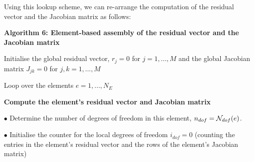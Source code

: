 Using this lookup scheme, we can re-\/arrange the computation of the residual vector and the Jacobian matrix as follows\-:

\begin{center} {\bfseries  Algorithm 6\-: Element-\/based assembly of the residual vector and the Jacobian matrix } \end{center} 
\begin{DoxyItemize}
\item Initialise the global residual vector, $ r_j=0 $ for $j=1,...,M $ and the global Jacobian matrix $ J_{jk}=0 $ for $j,k=1,...,M $
\item Loop over the elements $ e=1,...,N_E$ \par
\par
 \begin{center} {\bfseries  Compute the element's residual vector and Jacobian matrix } \end{center}  \par
 $ \bullet $ Determine the number of degrees of freedom in this element, $ n_{dof}={\cal N}_{dof}(e) $. \par
 $ \bullet $ Initialise the counter for the local degrees of freedom $ i_{dof}=0$ (counting the entries in the element's residual vector and the rows of the element's Jacobian matrix) \par


\end{DoxyItemize}
